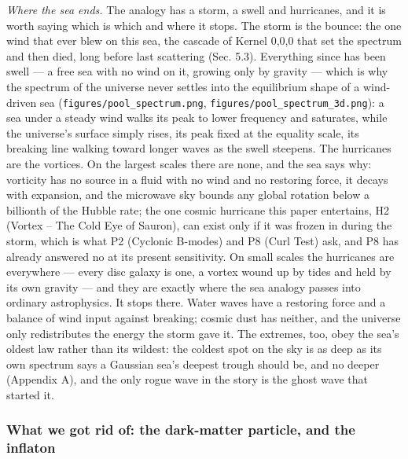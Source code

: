 \documentclass[
  11pt,
]{article}
\begin{document}
\emph{Where the sea ends.} The analogy has a storm, a swell and
hurricanes, and it is worth saying which is which and where it stops.
The storm is the bounce: the one wind that ever blew on this sea, the
cascade of Kernel 0,0,0 that set the spectrum and then died, long before
last scattering (Sec. 5.3). Everything since has been swell --- a free
sea with no wind on it, growing only by gravity --- which is why the
spectrum of the universe never settles into the equilibrium shape of a
wind-driven sea (\texttt{figures/pool\_spectrum.png},
\texttt{figures/pool\_spectrum\_3d.png}): a sea under a steady wind
walks its peak to lower frequency and saturates, while the universe's
surface simply rises, its peak fixed at the equality scale, its breaking
line walking toward longer waves as the swell steepens. The hurricanes
are the vortices. On the largest scales there are none, and the sea says
why: vorticity has no source in a fluid with no wind and no restoring
force, it decays with expansion, and the microwave sky bounds any global
rotation below a billionth of the Hubble rate; the one cosmic hurricane
this paper entertains, H2 (Vortex -- The Cold Eye of Sauron), can exist
only if it was frozen in during the storm, which is what P2 (Cyclonic
B-modes) and P8 (Curl Test) ask, and P8 has already answered no at its
present sensitivity. On small scales the hurricanes are everywhere ---
every disc galaxy is one, a vortex wound up by tides and held by its own
gravity --- and they are exactly where the sea analogy passes into
ordinary astrophysics. It stops there. Water waves have a restoring
force and a balance of wind input against breaking; cosmic dust has
neither, and the universe only redistributes the energy the storm gave
it. The extremes, too, obey the sea's oldest law rather than its
wildest: the coldest spot on the sky is as deep as its own spectrum says
a Gaussian sea's deepest trough should be, and no deeper (Appendix A),
and the only rogue wave in the story is the ghost wave that started it.

\hypertarget{what-we-got-rid-of-the-dark-matter-particle-and-the-inflaton}{%
\subsubsection{What we got rid of: the dark-matter particle, and the
inflaton}\label{what-we-got-rid-of-the-dark-matter-particle-and-the-inflaton}}
\end{document}
